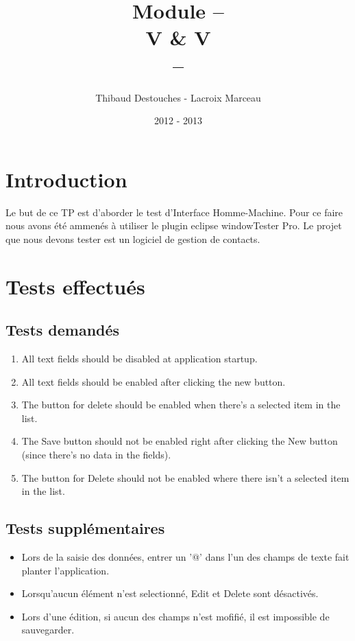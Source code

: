 \documentclass{article}
\title{Module --
\\
V \& V
\\
--}
\author{Thibaud Destouches - Lacroix Marceau}
\date{2012 - 2013}
\begin{document}
\begin{titlepage}
\maketitle
\tableofcontents
\end{titlepage}

\newpage
\section{Introduction}

Le but de ce TP est d’aborder le test d’Interface Homme-Machine. Pour ce faire nous avons été ammenés à utiliser le plugin eclipse windowTester Pro. Le projet que nous devons tester est un logiciel de gestion de contacts.

\section{Tests effectués}

\subsection{Tests demandés}
\begin{enumerate}
\item All text fields should be disabled at application startup.
\item All text fields should be enabled after clicking the new button.
\item The button for delete should be enabled when there's a selected item in the list.
\item The Save button should not be enabled right after clicking the New button (since there's no data in the fields). 
\item The button for Delete should not be enabled where there isn't a selected item in the list.
\end{enumerate}
\subsection{Tests supplémentaires}
\begin{itemize}
\item Lors de la saisie des données, entrer un '@' dans l'un des champs de texte fait planter l'application.	
\item Lorsqu'aucun élément n'est selectionné, Edit et Delete sont désactivés.
\item Lors d'une édition, si aucun des champs n'est mofifié, il est impossible de sauvegarder.
\end{itemize}
\end{document}
